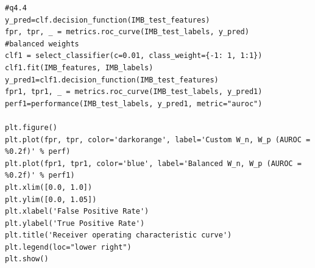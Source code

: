 \documentclass{article}
\begin{document}
\begin{lstlisting}
#q4.4
y_pred=clf.decision_function(IMB_test_features)
fpr, tpr, _ = metrics.roc_curve(IMB_test_labels, y_pred)
#balanced weights
clf1 = select_classifier(c=0.01, class_weight={-1: 1, 1:1})
clf1.fit(IMB_features, IMB_labels)
y_pred1=clf1.decision_function(IMB_test_features)
fpr1, tpr1, _ = metrics.roc_curve(IMB_test_labels, y_pred1)
perf1=performance(IMB_test_labels, y_pred1, metric="auroc")

plt.figure()
plt.plot(fpr, tpr, color='darkorange', label='Custom W_n, W_p (AUROC = %0.2f)' % perf)
plt.plot(fpr1, tpr1, color='blue', label='Balanced W_n, W_p (AUROC = %0.2f)' % perf1)
plt.xlim([0.0, 1.0])
plt.ylim([0.0, 1.05])
plt.xlabel('False Positive Rate')
plt.ylabel('True Positive Rate')
plt.title('Receiver operating characteristic curve')
plt.legend(loc="lower right")
plt.show()
\end{lstlisting}
\end{document}
